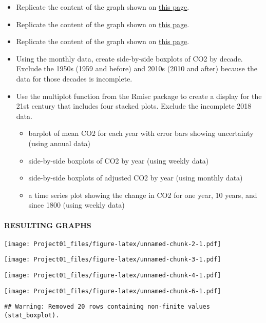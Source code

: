 \documentclass[]{article}
\providecommand{\tightlist}{%
  \setlength{\itemsep}{0pt}\setlength{\parskip}{0pt}}
\let\oldparagraph\paragraph
\renewcommand{\paragraph}[1]{\oldparagraph{#1}\mbox{}}
\begin{document}
\begin{itemize}
\item
  Replicate the content of the graph shown on
  \href{https://www.esrl.noaa.gov/gmd/ccgg/trends/index.html}{this
  page}.
\item
  Replicate the content of the graph shown on
  \href{https://www.esrl.noaa.gov/gmd/ccgg/trends/full.html}{this page}.
\item
  Replicate the content of the graph shown on
  \href{https://www.esrl.noaa.gov/gmd/ccgg/trends/gr.html}{this page}.
\item
  Using the monthly data, create side-by-side boxplots of CO2 by decade.
  Exclude the 1950s (1959 and before) and 2010s (2010 and after) because
  the data for those decades is incomplete.
\item
  Use the multiplot function from the Rmisc package to create a display
  for the 21st century that includes four stacked plots. Exclude the
  incomplete 2018 data.

  \begin{itemize}
  \tightlist
  \item
    barplot of mean CO2 for each year with error bars showing
    uncertainty (using annual data)
  \item
    side-by-side boxplots of CO2 by year (using weekly data)
  \item
    side-by-side boxplots of adjusted CO2 by year (using monthly data)
  \item
    a time series plot showing the change in CO2 for one year, 10 years,
    and since 1800 (using weekly data)
  \end{itemize}
\end{itemize}

\paragraph{RESULTING GRAPHS}\label{resulting-graphs}

\texttt{[image: Project01\_files/figure-latex/unnamed-chunk-2-1.pdf]}

\texttt{[image: Project01\_files/figure-latex/unnamed-chunk-3-1.pdf]}

\texttt{[image: Project01\_files/figure-latex/unnamed-chunk-4-1.pdf]}

\texttt{[image: Project01\_files/figure-latex/unnamed-chunk-6-1.pdf]}

\begin{verbatim}
## Warning: Removed 20 rows containing non-finite values (stat_boxplot).
\end{verbatim}
\end{document}
